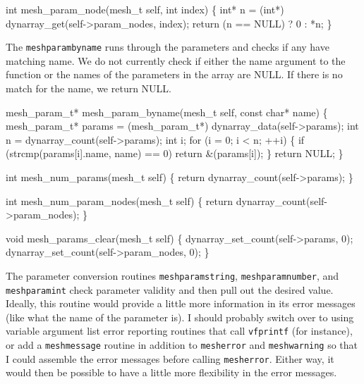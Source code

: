 int mesh_param_node(mesh_t self, int index)
\{
    int* n = (int*) dynarray_get(self->param_nodes, index);
    return (n == NULL) ? 0 : *n;
\}

\nwendcode{}\nwdocspar

The {\tt{}mesh{}param{}byname} runs through the parameters and checks if
any have matching name.  We do not currently check if either the 
name argument to the function or the names of the parameters in the 
array are NULL.  If there is no match for the name, we return NULL.

\nwenddocs{}\plusendmoddef
mesh_param_t* mesh_param_byname(mesh_t self, const char* name)
\{
    mesh_param_t* params = (mesh_param_t*) dynarray_data(self->params);
    int n = dynarray_count(self->params);
    int i;
    for (i = 0; i < n; ++i) \{
        if (strcmp(params[i].name, name) == 0)
            return &(params[i]);
    \}
    return NULL;
\}

\nwendcode{}\nwdocspar

\nwenddocs{}\plusendmoddef
int mesh_num_params(mesh_t self)
\{
    return dynarray_count(self->params);
\}

int mesh_num_param_nodes(mesh_t self)
\{
    return dynarray_count(self->param_nodes);
\}

\nwendcode{}\nwdocspar

\nwenddocs{}\plusendmoddef
void mesh_params_clear(mesh_t self)
\{
    dynarray_set_count(self->params, 0);
    dynarray_set_count(self->param_nodes, 0);
\}

\nwendcode{}\nwdocspar

The parameter conversion routines {\tt{}mesh{}param{}string},
{\tt{}mesh{}param{}number}, and {\tt{}mesh{}param{}int} check parameter
validity and then pull out the desired value.  Ideally, this
routine would provide a little more information in its error
messages (like what the name of the parameter is).  I should
probably switch over to using variable argument list error
reporting routines that call {\tt{}vfprintf} (for instance),
or add a {\tt{}mesh{}message} routine in addition to {\tt{}mesh{}error}
and {\tt{}mesh{}warning} so that I could assemble the error messages
before calling {\tt{}mesh{}error}.  Either way, it would then be
possible to have a little more flexibility in the error messages.

